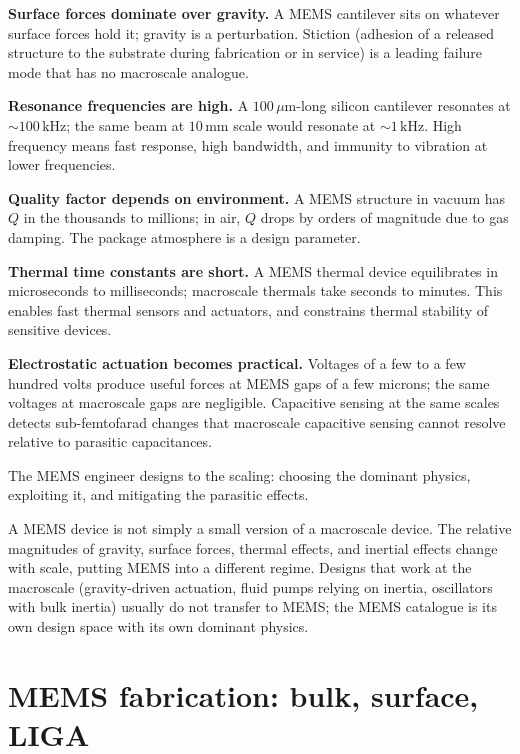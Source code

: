 \textbf{Surface forces dominate over gravity.} A MEMS cantilever sits on whatever surface forces hold it; gravity is a perturbation. Stiction (adhesion of a released structure to the substrate during fabrication or in service) is a leading failure mode that has no macroscale analogue.

\textbf{Resonance frequencies are high.} A $100\,\mu\text{m}$-long silicon cantilever resonates at $\sim 100\,\text{kHz}$; the same beam at $10\,\text{mm}$ scale would resonate at $\sim 1\,\text{kHz}$. High frequency means fast response, high bandwidth, and immunity to vibration at lower frequencies.

\textbf{Quality factor depends on environment.} A MEMS structure in vacuum has $Q$ in the thousands to millions; in air, $Q$ drops by orders of magnitude due to gas damping. The package atmosphere is a design parameter.

\textbf{Thermal time constants are short.} A MEMS thermal device equilibrates in microseconds to milliseconds; macroscale thermals take seconds to minutes. This enables fast thermal sensors and actuators, and constrains thermal stability of sensitive devices.

\textbf{Electrostatic actuation becomes practical.} Voltages of a few to a few hundred volts produce useful forces at MEMS gaps of a few microns; the same voltages at macroscale gaps are negligible. Capacitive sensing at the same scales detects sub-femtofarad changes that macroscale capacitive sensing cannot resolve relative to parasitic capacitances.

The MEMS engineer designs to the scaling: choosing the dominant physics, exploiting it, and mitigating the parasitic effects.

\begin{archetype}
A MEMS device is not simply a small version of a macroscale device. The relative magnitudes of gravity, surface forces, thermal effects, and inertial effects change with scale, putting MEMS into a different regime. Designs that work at the macroscale (gravity-driven actuation, fluid pumps relying on inertia, oscillators with bulk inertia) usually do not transfer to MEMS; the MEMS catalogue is its own design space with its own dominant physics.
\end{archetype}

\section{MEMS fabrication: bulk, surface, LIGA}

